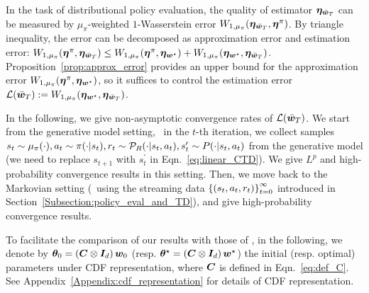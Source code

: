In the task of distributional policy evaluation, the quality of estimator $\bm{\eta}_{\bar{{\bm{w}}}_T}$ can be measured by $\mu_\pi$-weighted $1$-Wasserstein error $W_{1,\mu_\pi}(\bm{\eta}_{\bar{{\bm{w}}}_T},\bm{\eta}^\pi)$.
By triangle inequality, the error can be decomposed as approximation error and estimation error: $W_{1,\mu_\pi}(\bm{\eta}^\pi,\bm{\eta}_{\bar{{\bm{w}}}_T})\leq W_{1,\mu_\pi}(\bm{\eta}^\pi,\bm{\eta}_{{\bm{w}}^{\star}})+W_{1,\mu_\pi}(\bm{\eta}_{{\bm{w}}^{\star}},\bm{\eta}_{\bar{{\bm{w}}}_T})$.
Proposition~\ref{prop:approx_error} provides an upper bound for the approximation error $W_{1,\mu_\pi}(\bm{\eta}^\pi,\bm{\eta}_{{\bm{w}}^{\star}})$, so it suffices to control the estimation error ${\mathcal{L}}(\bar{{\bm{w}}}_T):=W_{1,\mu_\pi}(\bm{\eta}_{{\bm{w}}^{\star}},\bm{\eta}_{\bar{{\bm{w}}}_T})$.

In the following, we give non-asymptotic convergence rates of ${\mathcal{L}}(\bar{{\bm{w}}}_T)$.
We start from the generative model setting, \ie\ in the $t$-th iteration, we collect samples $s_t\sim\mu_{\pi}(\cdot), a_t\sim\pi(\cdot|s_t), r_t\sim {\mathcal{P}}_R(\cdot|s_t,a_t), s_t^\prime\sim P(\cdot|s_t,a_t)$ from the generative model (we need to replace $s_{t+1}$ with $s_t^\prime$ in {\LCTD} Eqn.~\eqref{eq:linear_CTD}).
We give $L^p$ and high-probability convergence results in this setting.
Then, we move back to the Markovian setting (\ie\  using the streaming data $\left\{{\left({s_t,a_t,r_t}\right)}\right\}_{t=0}^\infty$ introduced in Section~\ref{Subsection:policy_eval_and_TD}), and give high-probability convergence results.

To facilitate the comparison of our results with those of {\LTD}, in the following, we denote by ${\bm{\theta}}_0=\left({{\bm{C}}\otimes {\bm{I}}_d}\right){\bm{w}}_0$ (resp. ${\bm{\theta}}^\star=\left({{\bm{C}}\otimes {\bm{I}}_d}\right){\bm{w}}^\star$) the initial (resp. optimal) parameters under CDF representation, where ${\bm{C}}$ is defined in Eqn.~\eqref{eq:def_C}.
See Appendix~\ref{Appendix:cdf_representation} for details of CDF representation. 
